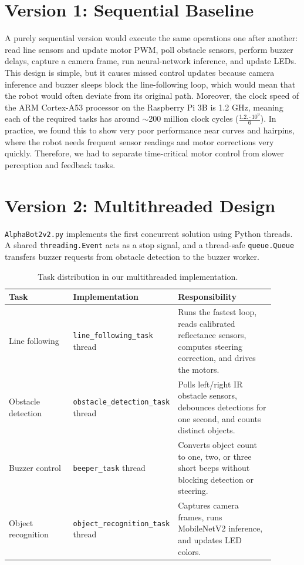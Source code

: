 \documentclass[10pt,a4paper]{article}
\begin{document}
\section{Version 1: Sequential Baseline}
A purely sequential version would execute the same operations one after another: read line sensors and update motor PWM, poll obstacle sensors, perform buzzer delays, capture a camera frame, run neural-network inference, and update LEDs. This design is simple, but it causes missed control updates because camera inference and buzzer sleeps block the line-following loop, which would mean that the robot would often deviate from its original path. Moreover, the clock speed of the ARM Cortex-A53 processor on the Raspberry Pi 3B is 1.2 GHz, meaning each of the required tasks has around $\sim$200 million clock cycles ($\frac{1.2. \cdot 10^9}{6}$). In practice, we found this to show very poor performance near curves and hairpins, where the robot needs frequent sensor readings and motor corrections very quickly. Therefore, we had to separate time-critical motor control from slower perception and feedback tasks.

\section{Version 2: Multithreaded Design}
\texttt{AlphaBot2v2.py} implements the first concurrent solution using Python threads. A shared \texttt{threading.Event} acts as a stop signal, and a thread-safe \texttt{queue.Queue} transfers buzzer requests from obstacle detection to the buzzer worker.

\begin{table}[htbp]
\centering
\begin{tabular}{L{0.25\linewidth}L{0.27\linewidth}L{0.38\linewidth}}
\toprule
Task & Implementation & Responsibility \\
\midrule
Line following & \texttt{line\_following\_task} thread & Runs the fastest loop, reads calibrated reflectance sensors, computes steering correction, and drives the motors. \\
Obstacle detection & \texttt{obstacle\_detection\_task} thread & Polls left/right IR obstacle sensors, debounces detections for one second, and counts distinct objects. \\
Buzzer control & \texttt{beeper\_task} thread & Converts object count to one, two, or three short beeps without blocking detection or steering. \\
Object recognition & \texttt{object\_recognition\_task} thread & Captures camera frames, runs MobileNetV2 inference, and updates LED colors. \\
\bottomrule
\end{tabular}
\caption{Task distribution in our multithreaded implementation.}
\end{table}
\end{document}

